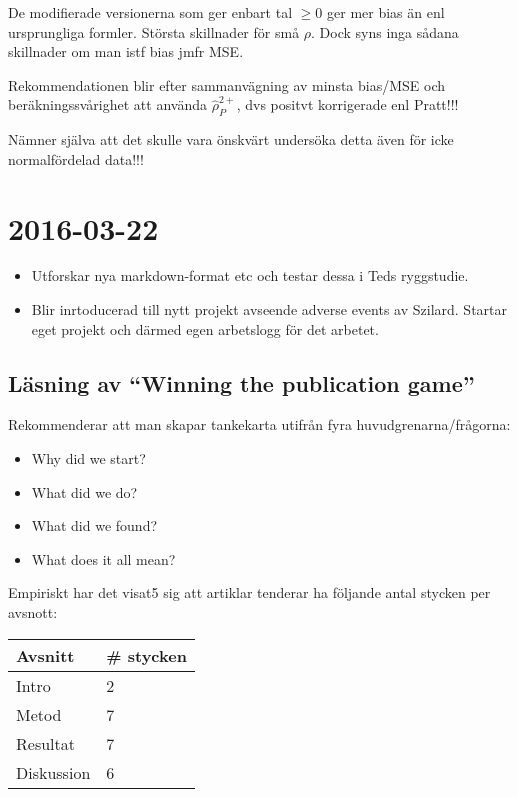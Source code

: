 \documentclass[]{article}
\providecommand{\tightlist}{%
  \setlength{\itemsep}{0pt}\setlength{\parskip}{0pt}}
\begin{document}
De modifierade versionerna som ger enbart tal \(\geq 0\) ger mer bias än
enl ursprungliga formler. Största skillnader för små \(\rho\). Dock syns
inga sådana skillnader om man istf bias jmfr MSE.

Rekommendationen blir efter sammanvägning av minsta bias/MSE och
beräkningssvårighet att använda \(\hat{\rho}^{2+}_P\), dvs positvt
korrigerade enl Pratt!!!

Nämner själva att det skulle vara önskvärt undersöka detta även för icke
normalfördelad data!!!

\section{2016-03-22}\label{section-1}

\begin{itemize}
\tightlist
\item
  Utforskar nya markdown-format etc och testar dessa i Teds ryggstudie.
\item
  Blir inrtoducerad till nytt projekt avseende adverse events av
  Szilard. Startar eget projekt och därmed egen arbetslogg för det
  arbetet.
\end{itemize}

\subsection{\texorpdfstring{Läsning av ``Winning the publication
game''}{Läsning av Winning the publication game}}\label{lasning-av-winning-the-publication-game}

Rekommenderar att man skapar tankekarta utifrån fyra
huvudgrenarna/frågorna:

\begin{itemize}
\tightlist
\item
  Why did we start?
\item
  What did we do?
\item
  What did we found?
\item
  What does it all mean?
\end{itemize}

Empiriskt har det visat5 sig att artiklar tenderar ha följande antal
stycken per avsnott:

\begin{longtable}[c]{@{}ll@{}}
\toprule
Avsnitt & \# stycken\tabularnewline
\midrule
\endhead
Intro & 2\tabularnewline
Metod & 7\tabularnewline
Resultat & 7\tabularnewline
Diskussion & 6\tabularnewline
\bottomrule
\end{longtable}
\end{document}
